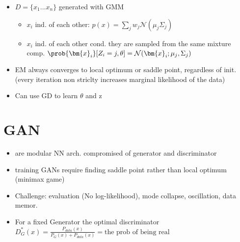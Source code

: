 \begin{itemize}
  \item $D=\{x_{1}...x_{n}\}$ generated with GMM
  \begin{itemize}
    \item $x_{i}$ ind. of each other: $p(x)=\sum_{j}w_{j}\mathcal{N}(\mu_{j}\Sigma_{j})$
    \item $x_{i}$ ind. of each other cond. they are sampled from the same mixture comp.
    $\prob{\bm{x}_{i}}[Z_{i} = j, \theta] = \mathcal{N}(\bm{x}_{i}; \mu_{j}, \Sigma_{j})$
  \end{itemize}
  \item EM always converges to local optimum or saddle point, regardless of init. (every iteration
  non striclty increases marginal likelihood of the data)
  \item Can use GD to learn $\theta$ and z
\end{itemize}


\section{GAN}
\begin{itemize}
  \item are modular NN arch. compromised of generator and discriminator
  \item training GANs require finding saddle point rather than local optimum (minimax game)
  \item Challenge: evaluation (No log-likelihood), mode collapse, oscillation, data memor.
  \item For a fixed Generator the optimal discriminator $D^{*}_{G}(x) =
  \frac{P_{data}(x)}{P_{G}(x)+P_{data}(x)}=\text{the prob of being real}$
\end{itemize}